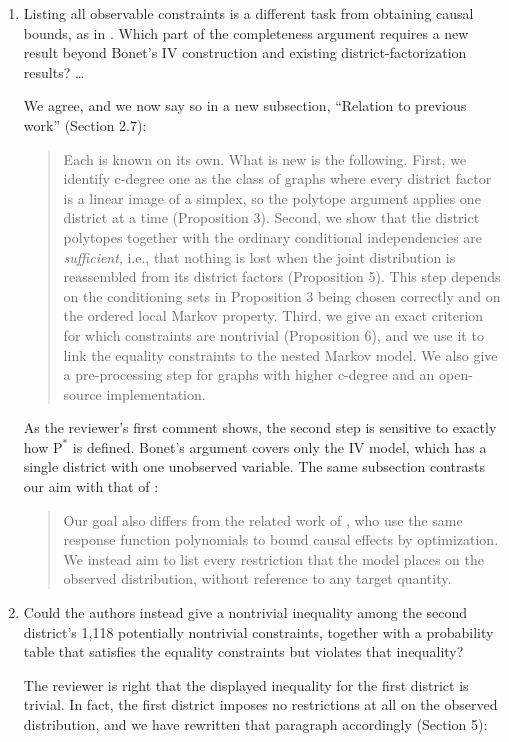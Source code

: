 \documentclass{article}
\def\Pdo{{\mathrm{P}^*}}
\begin{document}
\begin{enumerate}
    \item Listing all observable constraints is a different task from obtaining causal bounds, as in \citet{duarte2023automated}. Which part of the completeness argument requires a new result beyond Bonet's IV construction and existing district-factorization results? \ldots \,
    \begin{mdframed}
    We agree, and we now say so in a new subsection, ``Relation to previous work'' (Section 2.7):
    \begin{quote}
    Each is known on its own. What is new is the following. First, we identify c-degree one as the class of graphs where every district factor is a linear image of a simplex, so the polytope argument applies one district at a time (Proposition 3). Second, we show that the district polytopes together with the ordinary conditional independencies are \emph{sufficient}, i.e., that nothing is lost when the joint distribution is reassembled from its district factors (Proposition 5). This step depends on the conditioning sets in Proposition 3 being chosen correctly and on the ordered local Markov property. Third, we give an exact criterion for which constraints are nontrivial (Proposition 6), and we use it to link the equality constraints to the nested Markov model. We also give a pre-processing step for graphs with higher c-degree and an open-source implementation.
    \end{quote}
    As the reviewer's first comment shows, the second step is sensitive to exactly how $\Pdo$ is defined. Bonet's argument covers only the IV model, which has a single district with one unobserved variable. The same subsection contrasts our aim with that of \citet{duarte2023automated}:
    \begin{quote}
    Our goal also differs from the related work of \citet{duarte2023automated}, who use the same response function polynomials to bound causal effects by optimization. We instead aim to list every restriction that the model places on the observed distribution, without reference to any target quantity.
    \end{quote}
    \end{mdframed}
\item Could the authors instead give a nontrivial inequality among the second district's 1,118 potentially nontrivial constraints, together with a probability table that satisfies the equality constraints but violates that inequality?
\begin{mdframed}
    The reviewer is right that the displayed inequality for the first district is trivial. In fact, the first district imposes no restrictions at all on the observed distribution, and we have rewritten that paragraph accordingly (Section 5):

\end{mdframed}
\end{enumerate}
\end{document}
